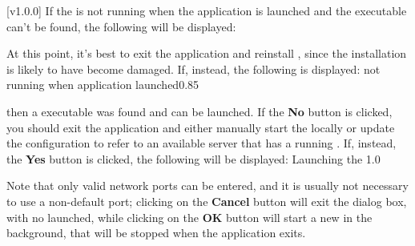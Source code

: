 [v1.0.0]
If the \emph{\RS} is not running when the \emph{\MMMU} application is launched and the
\emph{\RS} executable can't be found, the following will be displayed:

At this point, it's best to exit the \emph{\MMMU} application and reinstall \mplusm, since
the installation is likely to have become damaged.
If, instead, the following is displayed:
%
{\emph{\RS} not running when application launched}{0.85}

then a \emph{\RS} executable was found and can be launched.
If the \textbf{No} button is clicked, you should exit the \emph{\MMMU} application and
either manually start the \emph{\RS} locally or update the \yarp{} configuration to refer
to an available \yarp{} server that has a running \emph{\RS}.
\condPage{}
If, instead, the \textbf{Yes} button is clicked, the following will be displayed:
%
{Launching the \emph{\RS}}{1.0}

Note that only valid network ports can be entered, and it is usually not necessary to use
a non-default port; clicking on the \textbf{Cancel} button will exit the dialog box, with
no \emph{\RS} launched, while clicking on the \textbf{OK} button will start a new
\emph{\RS} in the background, that will be stopped when the \emph{\MMMU} application
exits.
\appendixEnd{}
